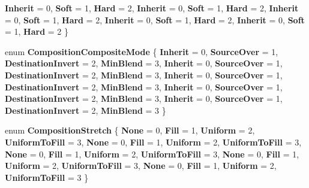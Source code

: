 \begin{DoxyCompactItemize}
{\bfseries Inherit} = 0, 
{\bfseries Soft} = 1, 
{\bfseries Hard} = 2, 
{\bfseries Inherit} = 0, 
\newline
{\bfseries Soft} = 1, 
{\bfseries Hard} = 2, 
{\bfseries Inherit} = 0, 
{\bfseries Soft} = 1, 
\newline
{\bfseries Hard} = 2, 
{\bfseries Inherit} = 0, 
{\bfseries Soft} = 1, 
{\bfseries Hard} = 2, 
\newline
{\bfseries Inherit} = 0, 
{\bfseries Soft} = 1, 
{\bfseries Hard} = 2
 \}
\item 
\mbox{\label{namespace_windows_1_1_u_i_1_1_composition_a70df9b7791d5834e00518dd51febcf2e}} 
enum {\bfseries Composition\+Composite\+Mode} \{ \newline
{\bfseries Inherit} = 0, 
{\bfseries Source\+Over} = 1, 
{\bfseries Destination\+Invert} = 2, 
{\bfseries Min\+Blend} = 3, 
\newline
{\bfseries Inherit} = 0, 
{\bfseries Source\+Over} = 1, 
{\bfseries Destination\+Invert} = 2, 
{\bfseries Min\+Blend} = 3, 
\newline
{\bfseries Inherit} = 0, 
{\bfseries Source\+Over} = 1, 
{\bfseries Destination\+Invert} = 2, 
{\bfseries Min\+Blend} = 3, 
\newline
{\bfseries Inherit} = 0, 
{\bfseries Source\+Over} = 1, 
{\bfseries Destination\+Invert} = 2, 
{\bfseries Min\+Blend} = 3, 
\newline
{\bfseries Inherit} = 0, 
{\bfseries Source\+Over} = 1, 
{\bfseries Destination\+Invert} = 2, 
{\bfseries Min\+Blend} = 3
 \}
\item 
\mbox{\label{namespace_windows_1_1_u_i_1_1_composition_abe147aa23cb612204b73bb75dc3137e8}} 
enum {\bfseries Composition\+Stretch} \{ \newline
{\bfseries None} = 0, 
{\bfseries Fill} = 1, 
{\bfseries Uniform} = 2, 
{\bfseries Uniform\+To\+Fill} = 3, 
\newline
{\bfseries None} = 0, 
{\bfseries Fill} = 1, 
{\bfseries Uniform} = 2, 
{\bfseries Uniform\+To\+Fill} = 3, 
\newline
{\bfseries None} = 0, 
{\bfseries Fill} = 1, 
{\bfseries Uniform} = 2, 
{\bfseries Uniform\+To\+Fill} = 3, 
\newline
{\bfseries None} = 0, 
{\bfseries Fill} = 1, 
{\bfseries Uniform} = 2, 
{\bfseries Uniform\+To\+Fill} = 3, 
\newline
{\bfseries None} = 0, 
{\bfseries Fill} = 1, 
{\bfseries Uniform} = 2, 
{\bfseries Uniform\+To\+Fill} = 3
 \}
\end{DoxyCompactItemize}
